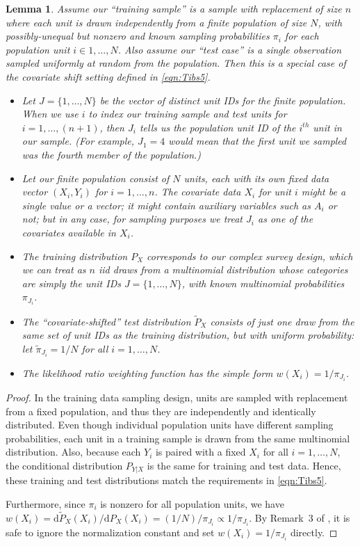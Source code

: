 \documentclass[10.5pt, letterpaper]{article}
\numberwithin{table}{section}
\numberwithin{figure}{section}
\numberwithin{equation}{section}
\newtheorem{lemma}{Lemma}
\begin{document}
\begin{lemma}\label{lem:PPSWR}
Assume our ``training sample'' is a sample with replacement of size $n$ where each unit is drawn independently from a finite population of size $N$, with possibly-unequal but nonzero and known sampling probabilities $\pi_i$ for each population unit $i \in 1,\ldots,N$. Also assume our ``test case'' is a single observation sampled uniformly at random from the population. Then this is a special case of the covariate shift setting defined in \eqref{eqn:Tibs5}.
\begin{itemize}
  \item Let $J = \{1,\ldots,N\}$ be the vector of distinct unit IDs for the finite population. When we use $i$ to index our training sample and test units for $i=1,\ldots,(n+1)$, then $J_i$ tells us the population unit ID of the $i^{th}$ unit in our sample. (For example, $J_1=4$ would mean that the first unit we sampled was the fourth member of the population.)
  \item Let our finite population consist of $N$ units, each with its own fixed data vector $(X_i,Y_i)$ for $i=1,\ldots,n$. The covariate data $X_i$ for unit $i$ might be a single value or a vector; it might contain auxiliary variables such as $A_i$ or not; but in any case, for sampling purposes we treat $J_i$ as one of the covariates available in $X_i$.
  \item The training distribution $P_X$ corresponds to our complex survey design, which we can treat as $n$ iid draws from a multinomial distribution whose categories are simply the unit IDs $J=\{1,\ldots,N\}$, with known multinomial probabilities $\pi_{J_i}$.
  \item The ``covariate-shifted'' test distribution $\tilde{P}_X$ consists of just one draw from the same set of unit IDs as the training distribution, but with uniform probability: let $\tilde{\pi}_{J_i} = 1/N$ for all $i=1,\ldots,N$.
  \item The likelihood ratio weighting function has the simple form $w(X_i) = 1/\pi_{J_i}$.
\end{itemize}
\end{lemma}
\begin{proof}
In the training data sampling design, units are sampled with replacement from a fixed population, and thus they are independently and identically distributed. Even though individual population units have different sampling probabilities, each unit in a training sample is drawn from the same multinomial distribution. Also, because each $Y_i$ is paired with a fixed $X_i$ for all $i=1,\ldots,N$, the conditional distribution $P_{Y|X}$ is the same for training and test data.
Hence, these training and test distributions match the requirements in \eqref{eqn:Tibs5}.

Furthermore, since $\pi_i$ is nonzero for all population units, we have $w(X_i) = \mathrm{d}\tilde{P}_X(X_i) / \mathrm{d}P_X(X_i) = (1/N) / \pi_{J_i} \propto 1/\pi_{J_i}$. By Remark~3 of \cite{tibshirani2019conformal}, it is safe to ignore the normalization constant and set $w(X_i) = 1/\pi_{J_i}$ directly.
\end{proof}
\end{document}

